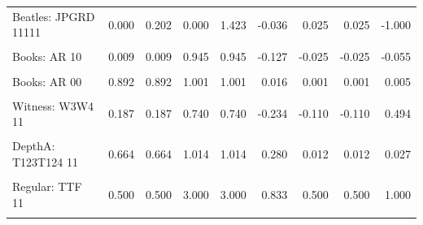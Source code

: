 \documentclass[
  10pt,
]{scrartcl}
\begin{document}
\begin{table}[H]
{\begin{tabular}[t]{lrrrrrrrr}
Beatles: JPGRD 11111 & 0.000 & 0.202 & 0.000 & 1.423 & -0.036 & 0.025 & 0.025 & -1.000\\
\cellcolor{gray!6}{Books: AR 11} & \cellcolor{gray!6}{0.014} & \cellcolor{gray!6}{0.014} & \cellcolor{gray!6}{1.493} & \cellcolor{gray!6}{1.493} & \cellcolor{gray!6}{0.212} & \cellcolor{gray!6}{0.027} & \cellcolor{gray!6}{0.027} & \cellcolor{gray!6}{0.055}\\
Books: AR 10 & 0.009 & 0.009 & 0.945 & 0.945 & -0.127 & -0.025 & -0.025 & -0.055\\
\cellcolor{gray!6}{Books: AR 01} & \cellcolor{gray!6}{0.100} & \cellcolor{gray!6}{0.100} & \cellcolor{gray!6}{0.995} & \cellcolor{gray!6}{0.995} & \cellcolor{gray!6}{-0.101} & \cellcolor{gray!6}{-0.003} & \cellcolor{gray!6}{-0.003} & \cellcolor{gray!6}{-0.005}\\
Books: AR 00 & 0.892 & 0.892 & 1.001 & 1.001 & 0.016 & 0.001 & 0.001 & 0.005\\
\cellcolor{gray!6}{Witness: W1W2 11} & \cellcolor{gray!6}{0.451} & \cellcolor{gray!6}{0.451} & \cellcolor{gray!6}{3.551} & \cellcolor{gray!6}{3.551} & \cellcolor{gray!6}{0.771} & \cellcolor{gray!6}{0.446} & \cellcolor{gray!6}{0.446} & \cellcolor{gray!6}{0.729}\\
Witness: W3W4 11 & 0.187 & 0.187 & 0.740 & 0.740 & -0.234 & -0.110 & -0.110 & 0.494\\
\cellcolor{gray!6}{Witness: W4W5 11} & \cellcolor{gray!6}{0.365} & \cellcolor{gray!6}{0.365} & \cellcolor{gray!6}{1.260} & \cellcolor{gray!6}{1.260} & \cellcolor{gray!6}{0.218} & \cellcolor{gray!6}{0.110} & \cellcolor{gray!6}{0.110} & \cellcolor{gray!6}{0.602}\\
DepthA: T123T124 11 & 0.664 & 0.664 & 1.014 & 1.014 & 0.280 & 0.012 & 0.012 & 0.027\\
\cellcolor{gray!6}{DepthB: T123T145 11} & \cellcolor{gray!6}{0.331} & \cellcolor{gray!6}{0.331} & \cellcolor{gray!6}{0.996} & \cellcolor{gray!6}{0.996} & \cellcolor{gray!6}{-0.047} & \cellcolor{gray!6}{-0.003} & \cellcolor{gray!6}{-0.003} & \cellcolor{gray!6}{-0.004}\\
Regular: TTF 11 & 0.500 & 0.500 & 3.000 & 3.000 & 0.833 & 0.500 & 0.500 & 1.000\\
\cellcolor{gray!6}{Dodecahedron: TTF 11} & \cellcolor{gray!6}{0.500} & \cellcolor{gray!6}{0.500} & \cellcolor{gray!6}{6.000} & \cellcolor{gray!6}{6.000} & \cellcolor{gray!6}{0.917} & \cellcolor{gray!6}{0.625} & \cellcolor{gray!6}{0.625} & \cellcolor{gray!6}{1.000}\\
\bottomrule
\end{tabular}}
\end{table}
\end{document}
